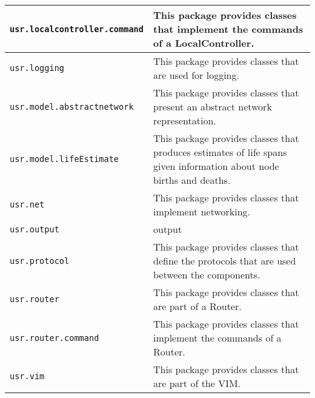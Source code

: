 {\begin{longtable}[l]{ | p{5.5cm} | p{8.5cm} | }
\hline
\footnotesize{\texttt{usr.localcontroller.command}} & This package provides classes that implement the commands of a LocalController. \\
\hline
\footnotesize{\texttt{usr.logging}} & This package provides classes that are used for logging. \\
\hline
\footnotesize{\texttt{usr.model.abstractnetwork}} & This package
provides classes that present an abstract network representation. \\
\hline
\footnotesize{\texttt{usr.model.lifeEstimate}} & This package
provides classes that  produces estimates of life spans given information about node births
   and deaths. \\
\hline
\footnotesize{\texttt{usr.net}} & This package provides classes that implement networking. \\
\hline
\footnotesize{\texttt{usr.output}} & output   \\
\hline
\footnotesize{\texttt{usr.protocol}} & This package provides classes that define the protocols that are used between the components. \\
\hline
\footnotesize{\texttt{usr.router}} & This package provides classes that are part of a Router. \\
\hline
\footnotesize{\texttt{usr.router.command}} & This package provides classes that implement
the commands of a Router. \\
\hline
\footnotesize{\texttt{usr.vim}} & This package provides classes that
are part of the VIM. \\
\hline
\end{longtable}


\normalsize

}
